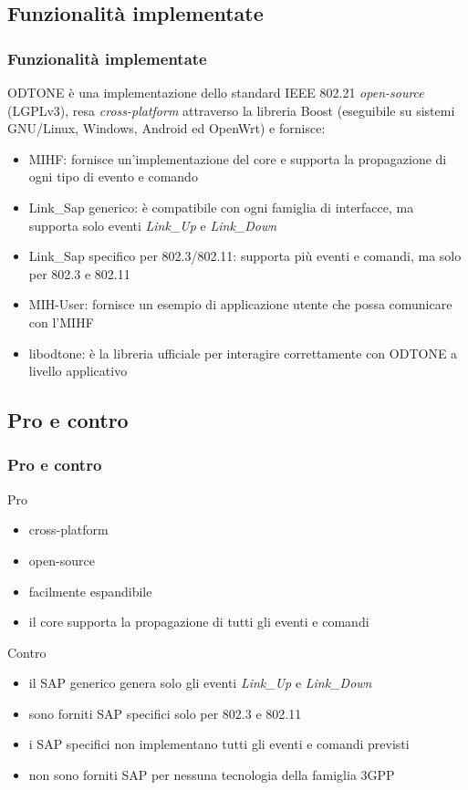 \documentclass[10pt]{beamer}
\begin{document}
\subsection{Funzionalità implementate}
\begin{frame}
\frametitle{Funzionalità implementate}
ODTONE è una implementazione dello standard IEEE 802.21 {\em open-source} (LGPLv3), resa {\em cross-platform} attraverso la libreria Boost (eseguibile su sistemi GNU/Linux, Windows, Android ed OpenWrt) e fornisce:

\begin{itemize}

\item MIHF: fornisce un'implementazione del core e supporta la propagazione di ogni tipo di evento e comando
\item Link\_Sap generico: è compatibile con ogni famiglia di interfacce, ma supporta solo eventi {\em Link\_Up} e {\em Link\_Down}
\item Link\_Sap specifico per 802.3/802.11: supporta più eventi e comandi, ma solo per 802.3 e 802.11
\item MIH-User: fornisce un esempio di applicazione utente che possa comunicare con l'MIHF
\item libodtone: è la libreria ufficiale per interagire correttamente con ODTONE a livello applicativo
\end{itemize}


\end{frame}
\subsection{Pro e contro}
\begin{frame}
\frametitle{Pro e contro}
\begin{block}{Pro}

\begin{itemize}
\item cross-platform
\item open-source
\item facilmente espandibile
\item il core supporta la propagazione di tutti gli eventi e comandi
\end{itemize}
\end{block}

\begin{block}{Contro}
\begin{itemize}
\item il SAP generico genera solo gli eventi {\em Link\_Up} e {\em Link\_Down}
\item sono forniti SAP specifici solo per 802.3 e 802.11
\item i SAP specifici non implementano tutti gli eventi e comandi previsti
\item non sono forniti SAP per nessuna tecnologia della famiglia 3GPP
\end{itemize}
\end{block}
\end{frame}
\end{document}
